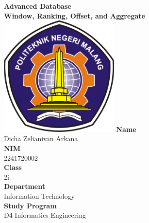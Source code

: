 \documentclass[12pt,titlepage]{article}
\newcommand{\vSubject}{Advanced Database}
\newcommand{\vSubtitle}{Window, Ranking, Offset, and Aggregate}
\newcommand{\vName}{Dicha Zelianivan Arkana}
\newcommand{\vNIM}{2241720002}
\newcommand{\vClass}{2i}
\newcommand{\vDepartment}{Information Technology}
\newcommand{\vStudyProgram}{D4 Informatics Engineering}
\begin{document}
\begin{titlepage}
    \centering
    \vfill
    {\bfseries\LARGE
        \vSubject\\
        \vskip0.25cm
        \vSubtitle
    }
    \vfill
    \includegraphics[width=6cm]{images/polinema-logo.png}
    \vfill
    {
        \textbf{Name}\\
        \vName\\
        \vskip0.5cm
        \textbf{NIM}\\
        \vNIM\\
        \vskip0.5cm
        \textbf{Class}\\
        \vClass\\
        \vskip0.5cm
        \textbf{Department}\\
        \vDepartment\\
        \vskip0.5cm
        \textbf{Study Program}\\
        \vStudyProgram
    }
\end{titlepage}
\end{document}
